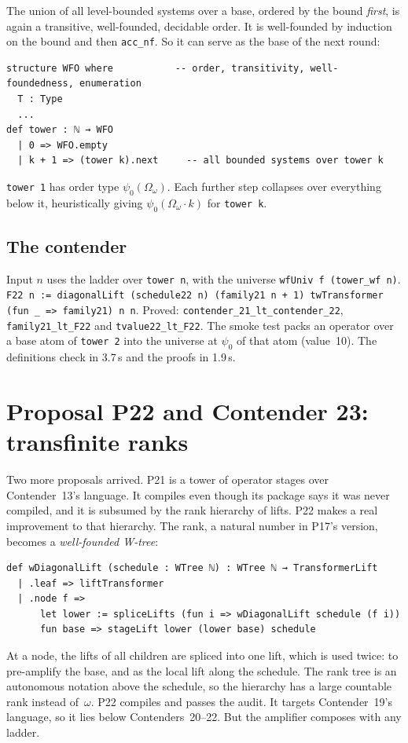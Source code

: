 \documentclass[11pt]{article}
\theoremstyle{definition}
\theoremstyle{remark}
\newcommand{\lean}[1]{\texttt{#1}}
\begin{document}
The union of all level-bounded systems over a base, ordered by the bound
\emph{first}, is again a transitive, well-founded, decidable order. It is
well-founded by induction on the bound and then \lean{acc\_nf}. So it can serve
as the base of the next round:
\begin{lstlisting}
structure WFO where           -- order, transitivity, well-foundedness, enumeration
  T : Type
  ...
def tower : ℕ → WFO
  | 0 => WFO.empty
  | k + 1 => (tower k).next     -- all bounded systems over tower k
\end{lstlisting}
\lean{tower 1} has order type $\psi_0(\Omega_\omega)$. Each further step
collapses over everything below it, heuristically giving
$\psi_0(\Omega_\omega\cdot k)$ for \lean{tower k}.

\subsection{The contender}
Input $n$ uses the ladder over \lean{tower n}, with the universe
\lean{wfUniv f (tower\_wf n)}.
\lean{F22 n := diagonalLift (schedule22 n) (family21 n + 1) twTransformer (fun \_ => family21) n n}.
Proved: \lean{contender\_21\_lt\_\allowbreak contender\_22},
\lean{family21\_lt\_F22} and \lean{tvalue22\_lt\_F22}. The smoke test packs an
operator over a base atom of \lean{tower 2} into the universe at $\psi_0$ of
that atom (value~10). The definitions check in 3.7\,s and the proofs in 1.9\,s.

\section{Proposal P22 and Contender 23: transfinite ranks}

Two more proposals arrived. P21 is a tower of operator stages over
Contender~13's language. It compiles even though its package says it was never
compiled, and it is subsumed by the rank hierarchy of lifts. P22 makes a real
improvement to that hierarchy. The rank, a natural number in P17's version, becomes a
\emph{well-founded W-tree}:
\begin{lstlisting}
def wDiagonalLift (schedule : WTree ℕ) : WTree ℕ → TransformerLift
  | .leaf => liftTransformer
  | .node f =>
      let lower := spliceLifts (fun i => wDiagonalLift schedule (f i))
      fun base => stageLift lower (lower base) schedule
\end{lstlisting}
At a node, the lifts of all children are spliced into one lift, which is used
twice: to pre-amplify the base, and as the local lift along the schedule. The
rank tree is an autonomous notation above the schedule, so the hierarchy has a
large countable rank instead of~$\omega$. P22 compiles and passes the audit. It
targets Contender~19's language, so it lies below Contenders~20--22. But the
amplifier composes with any ladder.
\end{document}
